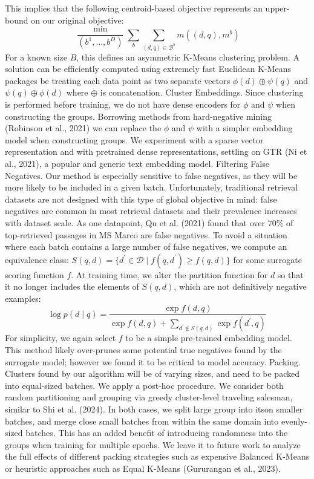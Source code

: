 \begin{tabular}
{This implies that the following centroid-based objective represents an upper-bound on our original objective:
\[
\frac{\min }{\left(b^{1}, \ldots, b^{D}\right)} \sum_{b} \sum_{(d, q) \in \mathcal{B}^{b}} m((d, q), m^{b})
\]
For a known size \(B\), this defines an asymmetric K-Means clustering problem. A solution can be efficiently computed using extremely fast Euclidean K-Means packages be treating each data point as two separate vectors \(\phi(d) \oplus \psi(q)\) and \(\psi(q) \oplus \phi(d)\) where \(\oplus\) is concatenation.
Cluster Embeddings. Since clustering is performed before training, we do not have dense encoders for \(\phi\) and \(\psi\) when constructing the groups. Borrowing methods from hard-negative mining (Robinson et al., 2021) we can replace the \(\phi\) and \(\psi\) with a simpler embedding model when constructing groups. We experiment with a sparse vector representation and with pretrained dense representations, settling on GTR (Ni et al., 2021), a popular and generic text embedding model.
Filtering False Negatives. Our method is especially sensitive to false negatives, as they will be more likely to be included in a given batch. Unfortunately, traditional retrieval datasets are not designed with this type of global objective in mind: false negatives are common in most retrieval datasets and their prevalence increases with dataset scale. As one datapoint, \(\mathrm{Qu}\) et al. (2021) found that over \(70 \%\) of top-retrieved passages in MS Marco are false negatives.
To avoid a situation where each batch contains a large number of false negatives, we compute an equivalence class: \(S(q, d)=\{d^{\prime} \in \mathcal{D} \mid f\left(q, d^{\prime}\right) \geq f(q, d)\}\) for some surrogate scoring function \(f\). At training time, we alter the partition function for \(d\) so that it no longer includes the elements of \(S(q, d)\), which are not definitively negative examples:
\[
\log p(d \mid q)=\frac{\exp f(d, q)}{\exp f(d, q)+\sum_{d^{\prime} \notin S(q, d)} \exp f\left(d^{\prime}, q\right)}
\]
For simplicity, we again select \(f\) to be a simple pre-trained embedding model. This method likely over-prunes some potential true negatives found by the surrogate model; however we found it to be critical to model accuracy.
Packing. Clusters found by our algorithm will be of varying sizes, and need to be packed into equal-sized batches. We apply a post-hoc procedure. We consider both random partitioning and grouping via greedy cluster-level traveling salesman, similar to Shi et al. (2024). In both cases, we split large group into itson smaller batches, and merge close small batches from within the same domain into evenly-sized batches. This has an added benefit of introducing randomness into the groups when training for multiple epochs. We leave it to future work to analyze the full effects of different packing strategies such as expensive Balanced K-Means or heuristic approaches such as Equal K-Means (Gururangan et al., 2023).
}
\end{tabular}
